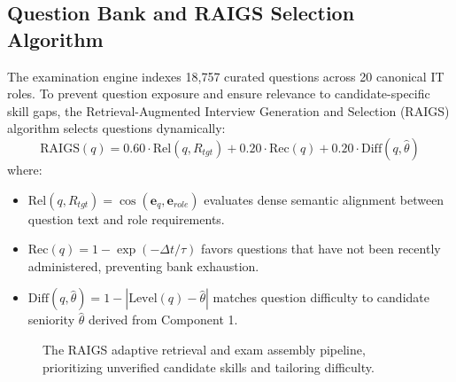 \documentclass[conference]{IEEEtran}
\begin{document}
\subsection{Question Bank and RAIGS Selection Algorithm}
The examination engine indexes 18,757 curated questions across 20 canonical IT roles. To prevent question exposure and ensure relevance to candidate-specific skill gaps, the Retrieval-Augmented Interview Generation and Selection (RAIGS) algorithm selects questions dynamically:
\begin{equation}
\text{RAIGS}(q) = 0.60 \cdot \text{Rel}(q, R_{tgt}) + 0.20 \cdot \text{Rec}(q) + 0.20 \cdot \text{Diff}(q, \hat{\theta})
\end{equation}
where:
\begin{itemize}
    \item $\text{Rel}(q, R_{tgt}) = \cos(\mathbf{e}_q, \mathbf{e}_{role})$ evaluates dense semantic alignment between question text and role requirements.
    \item $\text{Rec}(q) = 1 - \exp(-\Delta t / \tau)$ favors questions that have not been recently administered, preventing bank exhaustion.
    \item $\text{Diff}(q, \hat{\theta}) = 1 - |\text{Level}(q) - \hat{\theta}|$ matches question difficulty to candidate seniority $\hat{\theta}$ derived from Component 1.
\end{itemize}

\begin{figure}[t]
\centering
{}
\caption{The RAIGS adaptive retrieval and exam assembly pipeline, prioritizing unverified candidate skills and tailoring difficulty.}
\label{fig:raigs_flow}
\end{figure}
\end{document}
